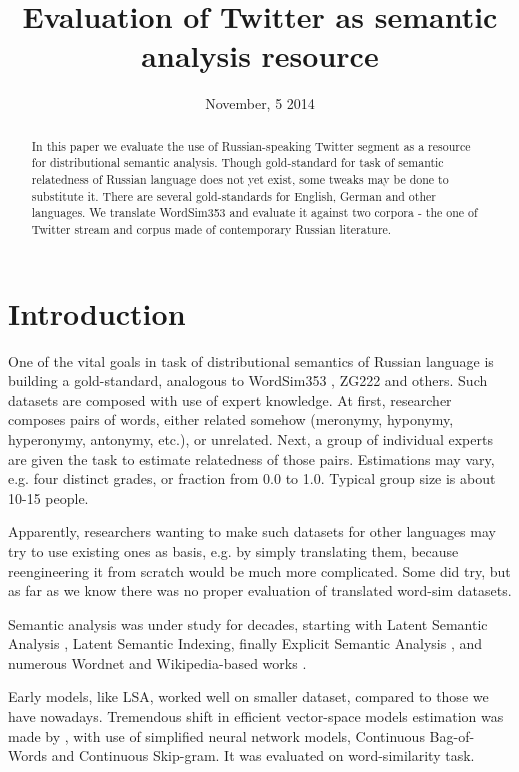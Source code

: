 \documentclass[11pt,letterpaper]{article}
\title{Evaluation of Twitter as semantic analysis resource}
\author{}
\date{November, 5 2014}
\begin{document}
\maketitle
\begin{abstract}
  In this paper we evaluate the use of Russian-speaking Twitter segment as a resource 
  for distributional semantic analysis. Though gold-standard for task of semantic relatedness
  of Russian language does not yet exist, some tweaks may be done to substitute it.  
  There are several gold-standards for English, German and other languages. 
  We translate WordSim353 and evaluate it against two corpora - the one of Twitter stream and 
  corpus made of contemporary Russian literature.
\end{abstract}

\section{Introduction}

One of the vital goals in task of distributional semantics of Russian language is building
a gold-standard, analogous to WordSim353 \cite{finkelstein2001placing}, ZG222 \cite{zesch2006auto} 
and others. 
Such datasets are composed with use of expert knowledge. At first, researcher composes pairs
of words, either related somehow (meronymy, hyponymy, hyperonymy, antonymy, etc.), or unrelated.
Next, a group of individual experts are given the task to estimate relatedness of those pairs.
Estimations may vary, e.g. four distinct grades, or fraction from 0.0 to 1.0. Typical group size is 
about 10-15 people.

Apparently, researchers wanting to make such datasets for other languages may try to use existing
ones as basis, e.g. by simply translating them, because reengineering it from scratch would be much more
complicated. Some did try, but as far as we know there was no proper evaluation of translated word-sim
datasets.

Semantic analysis
was under study for decades, starting with Latent Semantic Analysis \cite{landauer1998introduction}, 
Latent Semantic Indexing, finally Explicit Semantic Analysis \cite{gabrilovich2007computing}, and numerous
Wordnet and Wikipedia-based works \cite{zesch2008extracting}.

Early models, like LSA, worked well on smaller dataset, compared to those we have nowadays. 
Tremendous shift in efficient vector-space models estimation was made 
by \cite{mikolov2013efficient}, with use of simplified neural network models, Continuous Bag-of-Words
and Continuous Skip-gram. It was evaluated on word-similarity task. 
\end{document}

